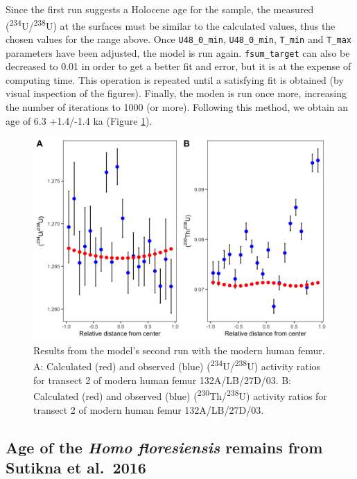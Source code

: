 \documentclass[]{elsarticle} %
\begin{document}
\FloatBarrier

Since the first run suggests a Holocene age for the sample, the measured (\textsuperscript{234}U/\textsuperscript{238}U) at the surfaces must be similar to the calculated values, thus the chosen values for the range above. Once \texttt{U48\_0\_min}, \texttt{U48\_0\_min}, \texttt{T\_min} and \texttt{T\_max} parameters have been adjusted, the model is run again. \texttt{fsum\_target} can also be decreased to 0.01 in order to get a better fit and error, but it is at the expense of computing time. This operation is repeated until a satisfying fit is obtained (by visual inspection of the figures). Finally, the moden is run once more, increasing the number of iterations to 1000 (or more). Following this method, we obtain an age of 6.3 +1.4/-1.4 ka (Figure \ref{fig:plot-panel-second-run-modern-fig}).



\begin{figure}
\includegraphics[width=1\linewidth]{figures/plot-panel-second-run-modern} \caption{Results from the model's second run with the modern human femur. A: Calculated (red) and observed (blue) (\textsuperscript{234}U/\textsuperscript{238}U) activity ratios for transect 2 of modern human femur 132A/LB/27D/03. B: Calculated (red) and observed (blue) (\textsuperscript{230}Th/\textsuperscript{238}U) activity ratios for transect 2 of modern human femur 132A/LB/27D/03.}\label{fig:plot-panel-second-run-modern-fig}
\end{figure}

\FloatBarrier

\hypertarget{age-of-the-homo-floresiensis-remains-from-sutikna-et-al.2016}{%
\subsection{\texorpdfstring{Age of the \emph{Homo floresiensis} remains from Sutikna et al.~2016}{Age of the Homo floresiensis remains from Sutikna et al.~2016}}\label{age-of-the-homo-floresiensis-remains-from-sutikna-et-al.2016}}
\end{document}
